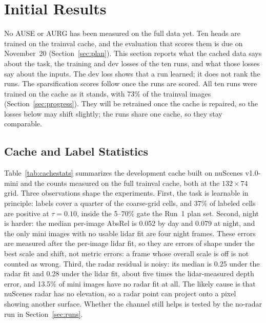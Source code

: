 \section{Initial Results}
\label{sec:results}

No AUSE or AURG has been measured on the full data yet. Ten heads are trained on the trainval cache, and the evaluation that scores them is due on November~20 (Section~\ref{sec:plan}). This section reports what the cached data says about the task, the training and dev losses of the ten runs, and what those losses say about the inputs. The dev loss shows that a run learned; it does not rank the runs. The sparsification scores follow once the runs are scored. All ten runs were trained on the cache as it stands, with 73\% of the trainval images (Section~\ref{sec:progress}). They will be retrained once the cache is repaired, so the losses below may shift slightly; the runs share one cache, so they stay comparable.

\subsection{Cache and Label Statistics}

Table~\ref{tab:cachestats} summarizes the development cache built on nuScenes v1.0-mini and the counts measured on the full trainval cache, both at the $132 \times 74$ grid. Three observations shape the experiments. First, the task is learnable in principle: labels cover a quarter of the coarse-grid cells, and 37\% of labeled cells are positive at $\tau = 0.10$, inside the 5--70\% gate the Run~1 plan set. Second, night is harder: the median per-image AbsRel is 0.052 by day and 0.079 at night, and the only mini images with no usable lidar fit are four night frames. These errors are measured after the per-image lidar fit, so they are errors of shape under the best scale and shift, not metric errors: a frame whose overall scale is off is not counted as wrong. Third, the radar residual is noisy: its median is 0.25 under the radar fit and 0.28 under the lidar fit, about five times the lidar-measured depth error, and 13.5\% of mini images have no radar fit at all. The likely cause is that nuScenes radar has no elevation, so a radar point can project onto a pixel showing another surface. Whether the channel still helps is tested by the no-radar run in Section~\ref{sec:runs}.

